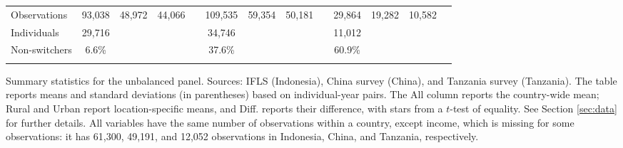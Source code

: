 \begin{table}[htbp]
\begin{threeparttable}
\begin{tabular}{l cccc cccc cccc}
\cmidrule(lr){2-13}
Observations & 93,038 & 48,972 & 44,066 &  & 109,535 & 59,354 & 50,181 &  & 29,864 & 19,282 & 10,582 &  \\  \addlinespace
Individuals & 29,716 &  &  &  & 34,746 &  &  &  & 11,012 &  &  &  \\
Non-switchers &    6.6\% &  &  &  &   37.6\% &  &  &  &   60.9\% &  &  &  \\  \addlinespace
\bottomrule \end{tabular} \begin{tablenotes}[flushleft] \footnotesize \item{Summary statistics for the unbalanced panel. Sources: IFLS (Indonesia), China survey (China), and Tanzania survey (Tanzania). The table reports means and standard deviations (in parentheses) based on individual-year pairs. The All column reports the country-wide mean; Rural and Urban report location-specific means, and Diff. reports their difference, with stars from a $t$-test of equality. See Section \ref{sec:data} for further details. All variables have the same number of observations within a country, except income, which is missing for some observations: it has 61,300, 49,191, and 12,052 observations in Indonesia, China, and Tanzania, respectively.}
\end{tablenotes}
\end{threeparttable} \end{table}
